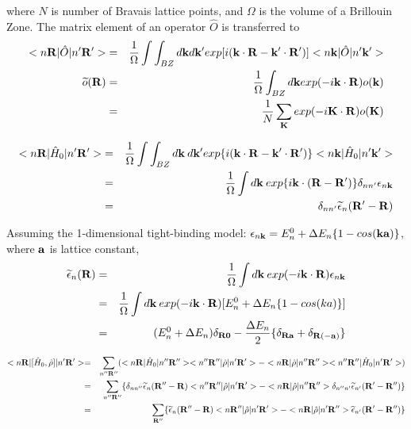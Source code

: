 \documentclass[aps,prb,preprint]{revtex4-1}
\begin{document}
\begin{appendix}
where $N$ is number of Bravais lattice points, and $\Omega$ is the volume of a Brillouin Zone. 
The matrix element of an operator $\hat{O}$ is transferred to 
\begin{eqnarray}
 < n{\bf R}| \hat{O} |n'{\bf R'}> &=& \frac{1}{\Omega} \int \int_{BZ} d{\bf k} d{\bf k'} exp[i ({\bf k} \cdot {\bf R}- {\bf k'} \cdot {\bf R'} ) ]< n{\bf k}| \hat{O} |n'{\bf k'}>  \\
 \widetilde{o}({\bf R}) &=& \frac{1}{\Omega} \int_{BZ} d{\bf k}  exp( - i{\bf k} \cdot {\bf R} ) o({\bf k}) \nonumber\\
 &=& \frac{1}{N} \sum_{\bf K}  exp( - i{\bf K} \cdot {\bf R} ) o({\bf K})
\end{eqnarray} 

\begin{eqnarray}
 < n{\bf R}| \hat{H}_0 |n'{\bf R'}> &=& \frac{1}{\Omega} \int \int_{BZ} d{\bf k} \:d{\bf k'} exp\{i ({\bf k} \cdot {\bf R}- {\bf k'} \cdot {\bf R'} ) \}< n{\bf k}| \hat{H}_0 |n'{\bf k'}>  \nonumber \nonumber \\
&=& \frac{1}{\Omega} \int d{\bf k} \: exp\{i{\bf k} \cdot ({\bf R- R'} ) \} \delta_{nn'} \epsilon_{n{\bf k}} \nonumber\\
&=& \delta_{nn'} \widetilde{\epsilon}_{n}({\bf R' - R} )  
\end{eqnarray} 

Assuming the 1-dimensional tight-binding model: $\epsilon_{n{\bf k}}= E^0_n + \Delta E_n \{1-cos({\bf ka})\}$, where $ \bf a$ is lattice constant,  
\begin{eqnarray}
 \widetilde{\epsilon}_{n}({\bf R} ) &=& \frac{1}{\Omega} \int d{\bf k} \: exp( -i{\bf k} \cdot {\bf R} ) \epsilon_{n{\bf k}} \nonumber \\
&=& \frac{1}{\Omega} \int d{\bf k} \: exp( -i{\bf k} \cdot {\bf R} ) [E^0_n + \Delta E_n \{1-cos(ka)\} ] \nonumber\\
&=& (E^0_n + \Delta E_n)\delta_{\bf R 0} - \frac{\Delta E_n}{2} \{ \delta_{\bf R a} + \delta_{\bf R(-a)} \} \\
\end{eqnarray} 

\begin{eqnarray}
 < n{\bf R}| [\hat{H}_0, \hat{\rho} ]|n'{\bf R'}> = && \sum_{n''{\bf R''}} ( < n{\bf R}| \hat{H}_0 |n''{\bf R''}> < n''{\bf R''}|\hat{\rho} |n'{\bf R'}> -< n{\bf R}| \hat{\rho}|n''{\bf R''}> < n''{\bf R''}|\hat{H}_0 |n'{\bf R'}> ) \nonumber \\
 = && \sum_{n''{\bf R''}} \{ \delta_{nn''} \widetilde{\epsilon}_{n}({\bf R''- R} )  < n''{\bf R''}|\hat{\rho} |n'{\bf R'}> - < n{\bf R}| \hat{\rho}|n''{\bf R''}> \delta_{n''n'} \widetilde{\epsilon}_{n'}({\bf R'- R''} )   \} \nonumber \\
  = && \sum_{\bf R''} \{ \widetilde{\epsilon}_{n}({\bf R''- R} )  < n{\bf R''}|\hat{\rho} |n'{\bf R'}> - < n{\bf R}| \hat{\rho}|n'{\bf R''}> \widetilde{\epsilon}_{n'}({\bf R'- R''} )   \} \nonumber \\
\end{eqnarray} 


\end{appendix}
\end{document}
